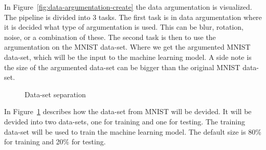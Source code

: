 In Figure~\ref{fig:data-argumentation-create} the data argumentation is visualized. The pipeline is divided into 3 tasks. The first task is in data argumentation where it is decided what type of argumentation is used. This can be blur, rotation, noise, or a combination of these. The second task is then to use the argumentation on the MNIST data-set. Where we get the argumented MNIST data-set, which will be the input to the machine learning model. A side note is the size of the argumented data-set can be bigger than the original MNIST data-set.

\begin{figure}[htb!]
    \centering
    
    \caption{Data-set separation}
    \label{fig:data-set-sepa}
\end{figure}

In Figure~\ref{fig:data-set-sepa} describes how the data-set from MNIST will be devided. It will be devided into two data-sets, one for training and one for testing. The training data-set will be used to train the machine learning model. The default size is 80\% for training and 20\% for testing.